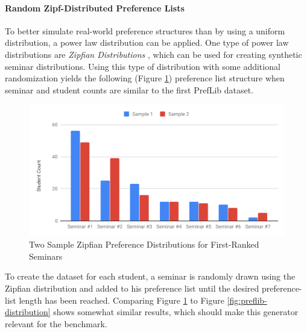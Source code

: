 \paragraph{Random Zipf-Distributed Preference Lists}
To better simulate real-world preference structures than by using a uniform distribution, a power law distribution can be applied. One type of power law distributions are \emph{Zipfian Distributions} \cite{Zipf}, which can be used for creating synthetic seminar distributions. Using this type of distribution with some additional randomization yields the following (Figure \ref{fig:zipfian-distribution}) preference list structure when seminar and student counts are similar to the first PrefLib dataset.

  \begin{figure}[h!]
    \centering
    \includegraphics[width=0.6\linewidth]{assets/plots/zipfian-distr.pdf}
    \caption{Two Sample Zipfian Preference Distributions for First-Ranked Seminars}
    \label{fig:zipfian-distribution}
\end{figure}

To create the dataset for each student, a seminar is randomly drawn using the Zipfian distribution and added to his preference list until the desired preference-list length has been reached. Comparing Figure \ref{fig:zipfian-distribution} to Figure \ref{fig:preflib-distribution} shows somewhat similar results, which should make this generator relevant for the benchmark. 

